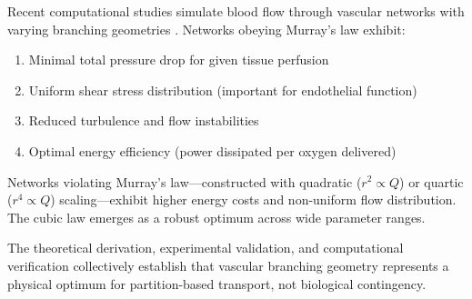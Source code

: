 Recent computational studies simulate blood flow through vascular networks with varying branching geometries \cite{huo2008intraspecific}. Networks obeying Murray's law exhibit:

\begin{enumerate}
\item Minimal total pressure drop for given tissue perfusion
\item Uniform shear stress distribution (important for endothelial function)
\item Reduced turbulence and flow instabilities
\item Optimal energy efficiency (power dissipated per oxygen delivered)
\end{enumerate}

Networks violating Murray's law—constructed with quadratic ($r^{2} \propto Q$) or quartic ($r^{4} \propto Q$) scaling—exhibit higher energy costs and non-uniform flow distribution. The cubic law emerges as a robust optimum across wide parameter ranges.

The theoretical derivation, experimental validation, and computational verification collectively establish that vascular branching geometry represents a physical optimum for partition-based transport, not biological contingency.
